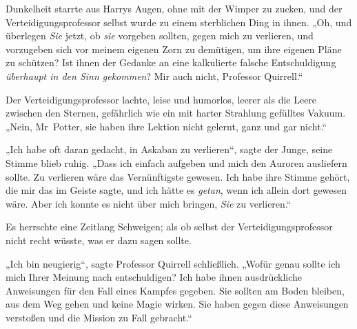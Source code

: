 Dunkelheit starrte aus Harrys Augen, ohne mit der Wimper zu zucken, und der Verteidigungsprofessor selbst wurde zu einem sterblichen Ding in ihnen.
„Oh, und überlegen \emph{Sie} jetzt, ob \emph{sie} vorgeben sollten, gegen mich zu verlieren, und vorzugeben sich vor meinem eigenen Zorn zu demütigen, um ihre eigenen Pläne zu schützen? Ist ihnen der Gedanke an eine kalkulierte falsche Entschuldigung \emph{überhaupt in den Sinn gekommen}? Mir auch nicht, Professor Quirrell.“

Der Verteidigungsprofessor lachte, leise und humorlos, leerer als die Leere zwischen den Sternen, gefährlich wie ein mit harter Strahlung gefülltes Vakuum.
„Nein, Mr~Potter, sie haben ihre Lektion nicht gelernt, ganz und gar nicht.“

„Ich habe oft daran gedacht, in Askaban zu verlieren“, sagte der Junge, seine Stimme blieb ruhig.
„Dass ich einfach aufgeben und mich den Auroren ausliefern sollte. Zu verlieren wäre das Vernünftigste gewesen. Ich habe ihre Stimme gehört, die mir das im Geiste sagte, und ich hätte es \emph{getan}, wenn ich allein dort gewesen wäre. Aber ich konnte es nicht über mich bringen, \emph{Sie} zu verlieren.“

Es herrschte eine Zeitlang Schweigen; als ob selbst der Verteidigungsprofessor nicht recht wüsste, was er dazu sagen sollte.

„Ich bin neugierig“, sagte Professor Quirrell schließlich.
„Wofür genau sollte ich mich Ihrer Meinung nach entschuldigen? Ich habe ihnen ausdrückliche Anweisungen für den Fall eines Kampfes gegeben. Sie sollten am Boden bleiben, aus dem Weg gehen und keine Magie wirken. Sie haben gegen diese Anweisungen verstoßen und die Mission zu Fall gebracht.“

